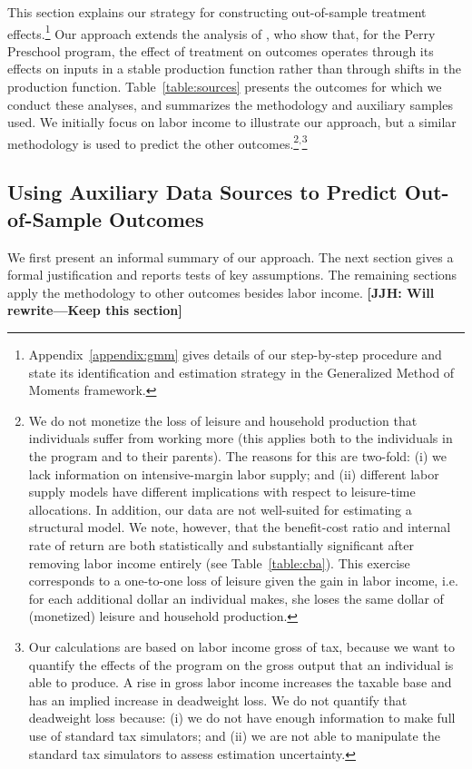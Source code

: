 This section explains our strategy for constructing out-of-sample treatment effects.\footnote{ Appendix~\ref{appendix:gmm} gives details of our step-by-step procedure and state its identification and estimation strategy in the Generalized Method of Moments framework.} Our approach extends the analysis of \citet{Heckman_Pinto_etal_2013_PerryFactor}, who show that, for the Perry Preschool program, the effect of treatment on outcomes operates through its effects on inputs in a stable production function rather than through shifts in the production function. Table~\ref{table:sources} presents the outcomes for which we conduct these analyses, and summarizes the methodology and auxiliary samples used. We initially focus on labor income to illustrate our approach, but a similar methodology is used to predict the other outcomes.\footnote{We do not monetize the loss of leisure and household production that individuals suffer from working more (this applies both to the individuals in the program and to their parents). The reasons for this are two-fold: (i) we lack information on intensive-margin labor supply; and (ii) different labor supply models have different implications with respect to leisure-time allocations. In addition, our data are not well-suited for estimating a structural model. We note, however, that the benefit-cost ratio and internal rate of return are both statistically and substantially significant after removing labor income entirely (see Table~\ref{table:cba}). This exercise corresponds to a one-to-one loss of leisure given the gain in labor income, i.e. for each additional dollar an individual makes, she loses the same dollar of (monetized) leisure and household production.}$^,$\footnote{Our calculations are based on labor income gross of tax, because we want to quantify the effects of the program on the gross output that an individual is able to produce. A rise in gross labor income increases the taxable base and has an implied increase in deadweight loss. We do not quantify that deadweight loss because: (i) we do not have enough information to make full use of standard tax simulators; and (ii) we are not able to manipulate the standard tax simulators to assess estimation uncertainty.}

\subsection{Using Auxiliary Data Sources to Predict Out-of-Sample Outcomes}\label{sec:usingaux}

We first present an informal summary of our approach. The next section gives a formal justification and reports tests of key assumptions. The remaining sections apply the methodology to other outcomes besides labor income.  \textbf{[JJH: Will rewrite---Keep this section]}

